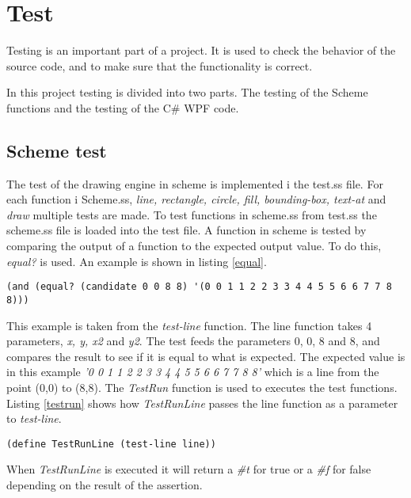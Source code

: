 \chapter{Test}
\label{chp:test}

Testing is an important part of a project. It is used to check the behavior of the source code, and to make sure that the functionality is correct.

In this project testing is divided into two parts. The testing of the Scheme functions and the testing of the C\# WPF code.

\section{Scheme test}
The test of the drawing engine in scheme  is implemented i the test.ss file. For each function i Scheme.ss, \emph{line, rectangle, circle, fill, bounding-box, text-at} and \emph{draw} multiple tests are made. To test functions in scheme.ss from test.ss the scheme.ss file is loaded into the test file. A function in scheme is tested by comparing the output of a function to the expected output value. To do this, \emph{equal?} is used. An example is shown in listing \ref{equal}.

\begin{lstlisting}[caption={Comparison of actual output with the expected output with equal?}, label=equal]
(and (equal? (candidate 0 0 8 8) '(0 0 1 1 2 2 3 3 4 4 5 5 6 6 7 7 8 8)))
\end{lstlisting}

This example is taken from the \emph{test-line} function. The line function takes 4 parameters, \emph{x, y, x2} and \emph{y2}. The test feeds the parameters 0, 0, 8 and 8, and compares the result to see if it is equal to what is expected. The expected value is in this example \emph{'0 0 1 1 2 2 3 3 4 4 5 5 6 6 7 7 8 8'} which is a line from the point (0,0) to (8,8). The \emph{TestRun} function is used to executes the test functions. Listing \ref{testrun} shows how \emph{TestRunLine} passes the line function as a parameter to \emph{test-line}. 

\begin{lstlisting}[caption={TestRunLine}, label=testrun]
(define TestRunLine (test-line line))
\end{lstlisting}

When \emph{TestRunLine} is executed it will return a \emph{\#t} for true or a \emph{\#f} for false depending on the result of the assertion.

